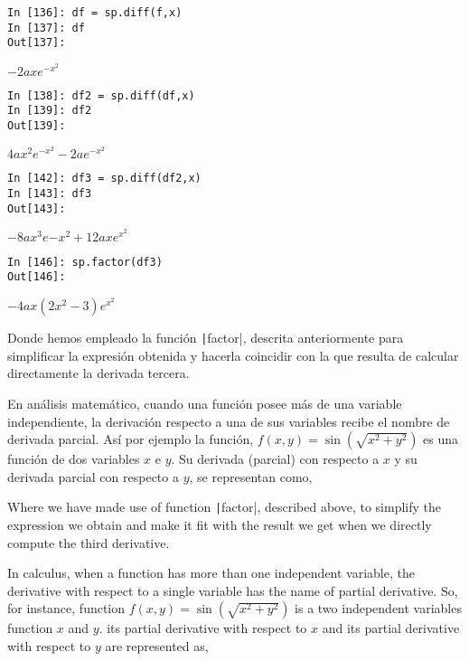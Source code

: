\begin{center}
	\begin{minipage}{.5\textwidth}
		\begin{verbatim}
In [136]: df = sp.diff(f,x)
In [137]: df
Out[137]: 			
		\end{verbatim}
		$-2axe^{-x^2}$
		\begin{verbatim}
In [138]: df2 = sp.diff(df,x)
In [139]: df2
Out[139]: 
		\end{verbatim}
		$4ax^2e^{-x^2}-2ae^{-x^2}$
		\begin{verbatim}
In [142]: df3 = sp.diff(df2,x)
In [143]: df3
Out[143]:  
		\end{verbatim}
		$-8ax^3e{-x^2} + 12axe^{x^2}$
		\begin{verbatim}
In [146]: sp.factor(df3)
Out[146]:   
\end{verbatim}
$-4ax(2x^2-3)e^{x^2}$
	\end{minipage}
\end{center}
\begin{paracol}{2}
\noindent Donde hemos empleado la función \texttt|factor|, descrita anteriormente para simplificar la expresión obtenida y hacerla coincidir con la que resulta de calcular directamente la derivada tercera.

En análisis matemático, cuando una función posee más de una variable independiente, la derivación respecto a una de sus variables recibe el nombre de derivada parcial. Así por ejemplo la función,
$f(x,y) =\sin \left( \sqrt{x^2+y^2} \right)$ es una función de dos variables $x$ e $y$. Su derivada (parcial) con respecto a $x$ y su derivada parcial con respecto a $y$, se representan como,

\switchcolumn
\noindent Where we have made use of function \texttt|factor|, described above, to simplify the expression we obtain and make it fit with the result we get when we directly compute the third derivative.

In calculus, when a function has more than one independent variable, the derivative with respect to a single variable has the name of partial derivative. So, for instance, function  $f(x,y) =\sin \left( \sqrt{x^2+y^2} \right)$  is a two independent variables function $x$ and $y$. its partial derivative with respect to $x$ and its partial derivative with respect to $y$ are represented as,
\end{paracol}

